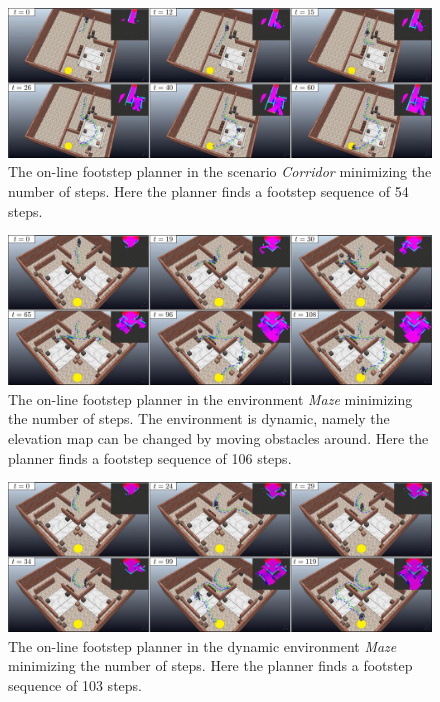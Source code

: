 \begin{figure}
    \centering
    \includegraphics[width=\textwidth]{figures/OnlineCorridor.jpeg}
    \caption{The on-line footstep planner in the scenario \textit{Corridor} minimizing the number of steps. Here the planner finds a footstep sequence of 54 steps.}
    \label{fig:WoS:onlineCase:Corridor:Simulation}
\end{figure}
\begin{figure}
    \centering
    \includegraphics[width=\textwidth]{figures/OnlineMazeDynamic.jpeg}
    \caption{The on-line footstep planner in the environment \textit{Maze} minimizing the number of steps. The environment is dynamic, namely the elevation map can be changed by moving obstacles around. Here the planner finds a footstep sequence of 106 steps.}
    \label{fig:WoS:onlineCase:MazeDynamic:Simulation}
\end{figure}
\begin{figure}
    \centering
    \includegraphics[width=\textwidth]{figures/OnlineMazeStopandgo.jpeg}
    \caption{The on-line footstep planner in the dynamic environment \textit{Maze} minimizing the number of steps. Here the planner finds a footstep sequence of 103 steps.}
    \label{fig:WoS:onlineCase:MazeStopAndGo:Simulation}
\end{figure}

